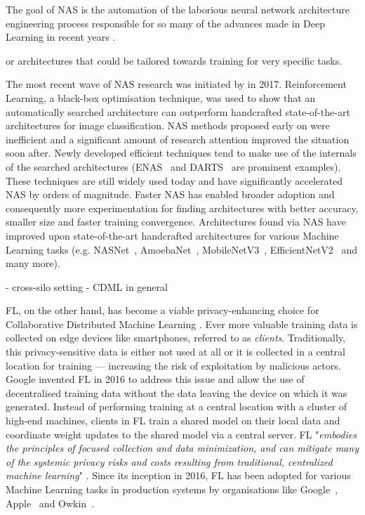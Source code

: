 The goal of NAS is the automation of the laborious neural network architecture engineering process responsible for so many of the advances made in Deep Learning in recent years \cite{nas_survey_2019}.

or architectures that could be tailored towards training for very specific tasks.

The most recent wave of NAS research was initiated by \cite{nas_with_rl_2017} in 2017. Reinforcement Learning, a black-box optimisation technique, was used to show that an automatically searched architecture can outperform handcrafted state-of-the-art architectures for image classification. NAS methods proposed early on were inefficient and a significant amount of research attention improved the situation soon after. Newly developed efficient techniques tend to make use of the internals of the searched architectures (ENAS~\cite{enas_2018} and DARTS~\cite{darts_2019} are prominent examples). These techniques are still widely used today and have significantly accelerated NAS by orders of magnitude. Faster NAS has enabled broader adoption and consequently more experimentation for finding architectures with better accuracy, smaller size and faster training convergence. Architectures found via NAS have improved upon state-of-the-art handcrafted architectures for various Machine Learning tasks (e.g. NASNet~\cite{nasnet_2018}, AmoebaNet~\cite{amoebanet_2019}, MobileNetV3~\cite{mobilenetv3_2019}, EfficientNetV2~\cite{efficientnetv2_2021} and many more).

- cross-silo setting
- CDML in general

FL, on the other hand, has become a viable privacy-enhancing choice for Collaborative Distributed Machine Learning \cite{cdml_2024}. Ever more valuable training data is collected on edge devices like smartphones, referred to as \textit{clients}. Traditionally, this privacy-sensitive data is either not used at all or it is collected in a central location for training — increasing the risk of exploitation by malicious actors. Google invented FL in 2016 to address this issue and allow the use of decentralised training data without the data leaving the device on which it was generated. Instead of performing training at a central location with a cluster of high-end machines, clients in FL train a shared model on their local data and coordinate weight updates to the shared model via a central server. FL "\textit{embodies the principles of focused collection and data minimization, and can mitigate many of the systemic privacy risks and costs resulting from traditional, centralized machine learning}" \cite{fl_advances_and_open_problems_2021}. Since its inception in 2016, FL has been adopted for various Machine Learning tasks in production systems by organisations like Google~\cite{gboard_fl_2018}, Apple~\cite{apple_fl_case_study_2025} and Owkin~\cite{owkin_fl_drug_discovery_in_prod_2022}.

